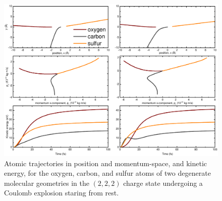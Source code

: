 \begin{figure}
  \centering
  \includegraphics[width=\textwidth]{Plots/DegenerateGeometryTrajectories.pdf}
  \caption[Atomic trajectories in position and momentum-space, and kinetic energy, of two degenerate molecular geometries undergoing a Coulomb explosion.]
  {Atomic trajectories in position and momentum-space, and kinetic energy, for the oxygen, carbon, and sulfur atoms of two degenerate  molecular geometries in the $(2,2,2)$ charge state undergoing a Coulomb explosion staring from rest.}
  \label{fig:DegenerateGeometryTrajectories}
\end{figure}

